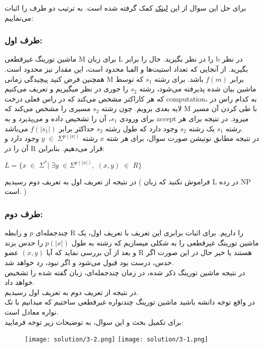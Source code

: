 برای حل این سوال از این 
\href{http://www.cs.mun.ca/~kol/courses/3719-w12/pnp_notes.pdf}{لینک}
کمک گرفته شده است.\newline
به ترتیب دو طرف را اثبات می‌نماییم:
\subsubsection*{طرف اول: }
ماشین تورینگ غیرقطعی M برای زبان L را در نظر بگیرید.
حال 
 را برابر 
b در نظر بگیرید.
از آنجایی که تعداد استیت‌ها و الفبا محدود است، این مقدار نیز محدود است.
همچنین فرض کنید پیچیدگی زمانی M برابر
$f(m)$ باشد. برای رشته $s_1$ که توسط ماشین بیان شده پذیرفته می‌شود، رشته $s_2$ را 
جوری در نظر میگیریم و تعریف می‌کنیم که هر کاراکتر مشخص می‌کند که در راس
فعلی درخت computation،
به کدام راس در لایه بعدی برویم.
چون رشته $s_2$ مسیری را مشخص می‌کند که M با طی کردن آن مسیر برای ورودی $s_1$، آن را تشخیص داده و می‌پذیرد و به accept میرود.
در نتیجه برای هر رشته $s_1$ یک رشته $s_2$ وجود دارد که طول رشته $s_2$ حداکثر برابر 
$f(|s_1|)$ می‌باشد.
\\
در نتیجه مطابق نوتیشن صورت سوال، برای هر شته $x$ رشته 
$y \;\in\; \Sigma^{p(|x|)}$ وجود دارد و آن را در R قرار می‌دهیم. بنابراین:
\begin{center}
    $L = \{ x\;\in\;\Sigma^*|\;\exists y\;\in \Sigma^{p(|x|)}, \;(x,y)\;\in\;R\}$
\end{center}
در نتیجه از تعریف اول به تعریف دوم رسیدیم 
( فراموش نکنید که زبان L در رده NP است. )

\subsubsection*{طرف دوم: }
چندجمله‌ای $p$ و رابطه R را داریم.
برای اثبات برابری این تعریف با تعریف اول، یک ماشین تورینگ غیرقطعی را به شکلی میسازیم که رشته به طول 
$p(|x|)$ را حدس بزند و بعد از آن بررسی نماید که آیا 
$(x,y)$ عضو R هستند یا خیر
حال در این صورت اگر حدس، درست بود قبول می‌شود و اگر نبود، رد خواهد شد.\\
در نتیجه ماشین تورینگ ذکر شده، در زمان چندجمله‌ای، زبان گفته شده را تشخیص خواهد داد.\\
در نتیجه از تعریف دوم به تعریف اول رسیدیم.
\\
در واقع توجه داتشه باشید ماشین تورینگ چندنواره غیرقطعی ساختیم که میدانیم با تک نواره معادل است.\\
برای تکمیل بحث و این سوال، به توضیحات زیر توجه فرمایید:

\begin{figure}[H]
    \centering
    \texttt{[image: solution/3-2.png]}
    \texttt{[image: solution/3-1.png]}
\end{figure}